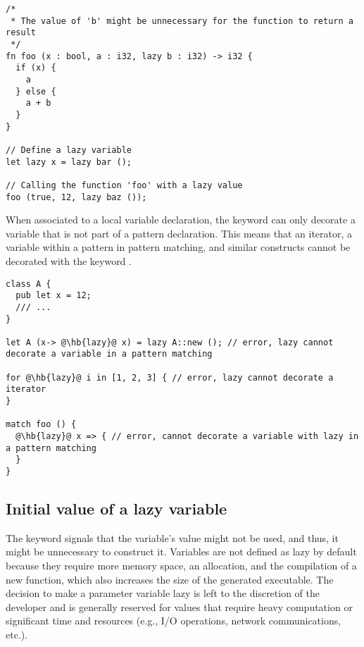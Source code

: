 
\begin{lstlisting}[style=coloredverbatim]
/*
 * The value of 'b' might be unnecessary for the function to return a result
 */
fn foo (x : bool, a : i32, lazy b : i32) -> i32 {
  if (x) {
    a
  } else {
    a + b
  }
}

// Define a lazy variable
let lazy x = lazy bar ();

// Calling the function 'foo' with a lazy value
foo (true, 12, lazy baz ());
\end{lstlisting}

When associated to a local variable declaration, the keyword  can
only decorate a variable that is not part of a pattern declaration. This means
that an iterator, a variable within a pattern in pattern matching, and similar
constructs cannot be decorated with the keyword .

\begin{lstlisting}[style=coloredverbatim, escapechar=@]
class A {
  pub let x = 12;
  /// ...
}

let A (x-> @\hb{lazy}@ x) = lazy A::new (); // error, lazy cannot decorate a variable in a pattern matching

for @\hb{lazy}@ i in [1, 2, 3] { // error, lazy cannot decorate a iterator
}

match foo () {
  @\hb{lazy}@ x => { // error, cannot decorate a variable with lazy in a pattern matching
  }
}
\end{lstlisting}

\subsection {Initial value of a lazy variable}
\label{sec:lazy_param}

The keyword  signals that the variable's value might not be used,
and thus, it might be unnecessary to construct it. Variables are not defined as
lazy by default because they require more memory space, an allocation, and the
compilation of a new function, which also increases the size of the generated
executable. The decision to make a parameter variable lazy is left to the
discretion of the developer and is generally reserved for values that require
heavy computation or significant time and resources (e.g., I/O operations,
network communications, etc.).

